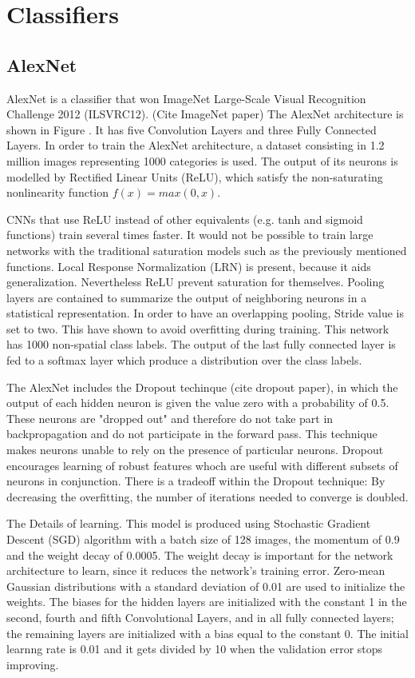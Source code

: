 \section{Classifiers}

\subsection{AlexNet}
AlexNet is a classifier that won ImageNet Large-Scale Visual Recognition Challenge 2012 (ILSVRC12). (Cite ImageNet paper) 
The AlexNet architecture is shown in Figure . It has five Convolution Layers and three Fully Connected Layers. In order to train the AlexNet architecture, a dataset consisting in 1.2 million images representing 1000 categories is used.
The output of its neurons is modelled by  Rectified Linear Units (ReLU), which satisfy the non-saturating nonlinearity function \(f(x) = max(0,x)\).

CNNs that use ReLU instead of other equivalents (e.g. tanh and sigmoid functions) train several times faster. It would not be possible to train large networks with the traditional saturation models such as the previously mentioned functions. 
Local Response Normalization (LRN) is present, because it aids generalization. Nevertheless ReLU prevent saturation for themselves.
Pooling layers are contained to summarize the output of neighboring neurons in a statistical representation. In order to have an overlapping pooling, Stride value is set to two. This have shown to avoid overfitting during training.
This network has 1000 non-spatial class labels. The output of the last fully connected layer is fed to a softmax layer which produce a distribution over the class labels.

The AlexNet includes the Dropout techinque (cite dropout paper), in which the output of each hidden neuron is given the value zero with a probability of 0.5. These neurons are "dropped out" and therefore do not take part in backpropagation and do not participate in the forward pass. This technique makes neurons unable to rely on the presence of  particular neurons. Dropout encourages learning of robust features whoch are useful with different subsets of neurons in conjunction. There is a tradeoff within the Dropout technique: By decreasing the overfitting, the number of iterations needed to converge is doubled.

The Details of learning.
This model is produced using Stochastic Gradient Descent (SGD) algorithm with a batch size of 128 images, the momentum of 0.9 and the weight decay of 0.0005. The weight decay is important for the network architecture to learn, since it reduces the network's training error.
Zero-mean Gaussian distributions with a standard deviation of 0.01 are used to initialize the weights. The biases for the hidden layers are initialized with the constant 1 in the second, fourth and fifth Convolutional Layers, and in all fully connected layers; the remaining layers are initialized with a bias equal to the constant 0. The initial learnng rate is 0.01 and it gets divided by 10 when the validation error stops improving. 
